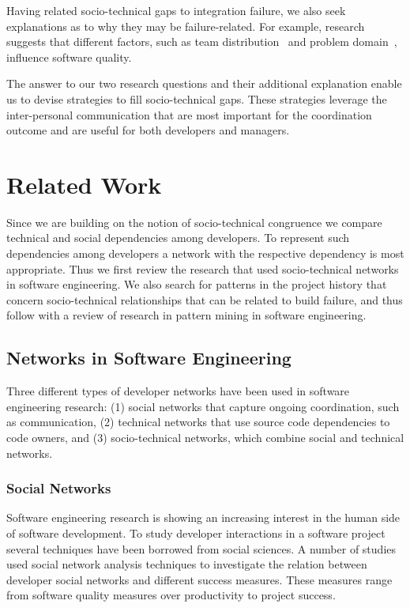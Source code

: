 \documentclass{sig-alternate}
\begin{document}
Having related socio-technical gaps to integration failure, we also seek
explanations as to why they may be failure-related. For example, research suggests that different factors, such as team distribution~\cite{bird:acm:2009} and problem domain~\cite{schroeter:isese:2006}, influence software quality.

The answer to our two research questions and their additional explanation
enable us to devise strategies to fill socio-technical gaps.
These strategies leverage the inter-personal communication that are most
important for the coordination outcome
%
and are useful for both developers and managers.













\section{Related Work}
Since we are building on the notion of socio-technical congruence we compare technical and social dependencies among developers.
To represent such dependencies among developers a network with the respective
dependency is most appropriate. Thus we first review the research that used
socio-technical networks in software engineering. We also search for patterns
in the project history that concern socio-technical relationships that can be
related to build failure, and thus follow with a review of research in pattern
mining in software engineering. 


\subsection{Networks in Software Engineering}
Three different types of developer networks have been used in software
engineering research: (1) social networks that capture ongoing coordination,
such as communication, (2) technical networks that use source code dependencies to code owners, and (3) socio-technical networks, which
combine social and technical networks. 

\subsubsection{Social Networks}
Software engineering research is showing an increasing interest in the human side
of software development. To study developer interactions in a software project
several techniques have been borrowed from social sciences. A number of studies
used social network analysis techniques to investigate the relation between
developer social networks and different success measures. These measures range from software quality measures over productivity to
project success.
\end{document}
